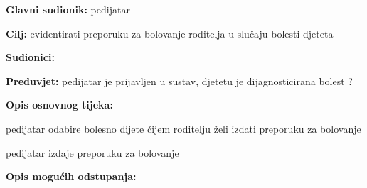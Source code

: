                     \noindent {}
					\begin{packed_item}
	
						\item \textbf{Glavni sudionik: }pedijatar
						\item  \textbf{Cilj:} evidentirati preporuku za bolovanje roditelja u slučaju bolesti djeteta
						\item  \textbf{Sudionici:} 
						\item  \textbf{Preduvjet:} pedijatar je prijavljen u sustav, djetetu je dijagnosticirana bolest ?
						\item  \textbf{Opis osnovnog tijeka:}
						
						\item[] \begin{packed_enum}
	
							\item pedijatar odabire bolesno dijete čijem roditelju želi izdati preporuku za bolovanje
							\item pedijatar izdaje preporuku za bolovanje
							\item 

						\end{packed_enum}
						
						\item  \textbf{Opis mogućih odstupanja:}
						
						\item[] \begin{packed_item}
	
							\item[2.a] 
							\item[] \begin{packed_enum}
								
								\item 
								\item 
							\end{packed_enum}
							
						\end{packed_item}
					\end{packed_item}

